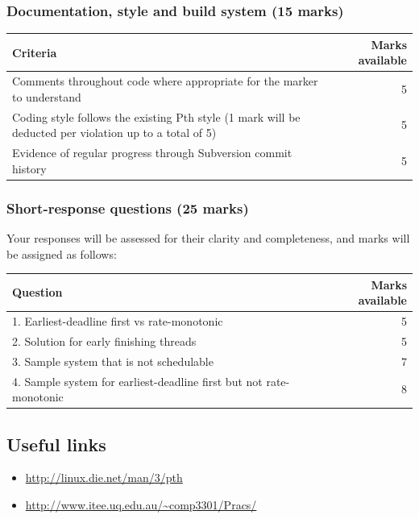 \documentclass[12pt,a4paper]{article}
\begin{document}
\subsubsection*{Documentation, style and build system (15 marks)}

\begin{longtable}{p{13cm} r}
    \toprule
    \textbf{Criteria} & \textbf{Marks available} \\

    \midrule
    Comments throughout code where appropriate for the marker to understand & 5 \\
    Coding style follows the existing Pth style (1 mark will be
        deducted per violation up to a total of 5) & 5 \\
    Evidence of regular progress through Subversion commit history & 5 \\

    \bottomrule
\end{longtable}

\subsubsection*{Short-response questions (25 marks)}

Your responses will be assessed for their clarity and completeness, and marks
will be assigned as follows:

\begin{longtable}{p{13cm} r}
    \toprule
    \textbf{Question} & \textbf{Marks available} \\
    \midrule

    1. Earliest-deadline first vs rate-monotonic & 5 \\
    2. Solution for early finishing threads & 5 \\
    3. Sample system that is not schedulable & 7 \\
    4. Sample system for earliest-deadline first but not rate-monotonic & 8 \\

    \bottomrule
\end{longtable}

\subsection*{Useful links}

\begin{itemize}
    \item \url{http://linux.die.net/man/3/pth}
    \item \url{http://www.itee.uq.edu.au/~comp3301/Pracs/}
\end{itemize}
\end{document}
